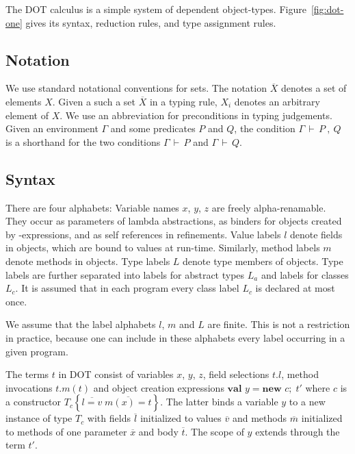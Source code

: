 \documentclass[9pt]{sigplanconf}
\newcommand{\figref}[1]
        {Figure~\ref{fig:#1}}
\newcommand{\ts}{\,\vdash\,}
\newcommand{\spcomma}{~,~}
\newcommand{\ldefs}[1]{\left\{#1\right\}}
\newcommand{\seq}[1]{\overline{#1}}
\newcommand{\new}[3]{\textbf{val }#1 = \textbf{new }#2 ;\; #3}
\begin{document}
The DOT calculus is a simple system of dependent
object-types. \figref{dot-one} gives its syntax, reduction rules,
and type assignment rules.

\subsection*{Notation} We use standard notational conventions for
sets. The notation $\seq{X}$ denotes a set of elements $X$. Given a
such a set $\seq X$ in a typing rule, $X_i$ denotes an arbitrary
element of $X$. 
We use an
abbreviation for preconditions in typing judgements. Given an
environment $\Gamma$ and some predicates $P$ and $Q$, the condition $\Gamma \ts P \spcomma Q$
is a shorthand for the two conditions $\Gamma \ts P$ and $\Gamma \ts Q$.

\subsection*{Syntax}

There are four alphabets: Variable names $x$, $y$, $z$ are freely
alpha-renamable. They occur as parameters of lambda abstractions, as
binders for objects created by \verb@new@-expressions, and as self
references in refinements. Value labels $l$ denote fields in objects,
which are bound to values at run-time. Similarly, method labels $m$
denote methods in objects. Type labels $L$ denote type members of
objects. Type labels are further separated into labels for abstract
types $L_a$ and labels for classes $L_c$. It is assumed that in each
program every class label $L_c$ is declared at most once.

We assume that the label alphabets $l$, $m$ and $L$ are finite. This is
not a restriction in practice, because one can include in these 
alphabets every label occurring in a given program.

The terms $t$ in DOT consist of variables $x$, $y$, $z$, field
selections $t.l$, method invocations $t.m(t)$ and object creation
expressions $\new y c {t'}$ where $c$ is a constructor $T_c \ldefs{\seq{l
    = v}\;\seq{m(x) = t}}$. The latter binds a variable $y$ to a new
instance of type $T_c$ with fields $\seq l$ initialized to values
$\seq v$ and methods $\seq m$ initialized to methods of one parameter
$\seq{x}$ and body $\seq{t}$.  The scope of $y$ extends through the term
${t'}$.
\end{document}
